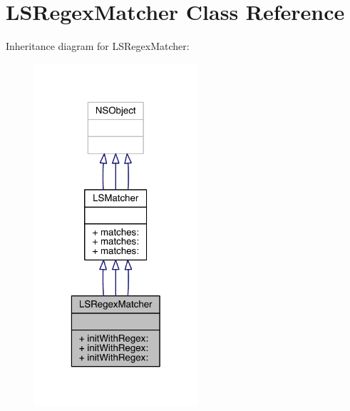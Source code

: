 \hypertarget{interface_l_s_regex_matcher}{\section{L\-S\-Regex\-Matcher Class Reference}
\label{interface_l_s_regex_matcher}
}


Inheritance diagram for L\-S\-Regex\-Matcher\-:\nopagebreak
\begin{figure}[H]
\begin{center}
\leavevmode
\includegraphics[width=172pt]{interface_l_s_regex_matcher__inherit__graph}
\end{center}
\end{figure}



